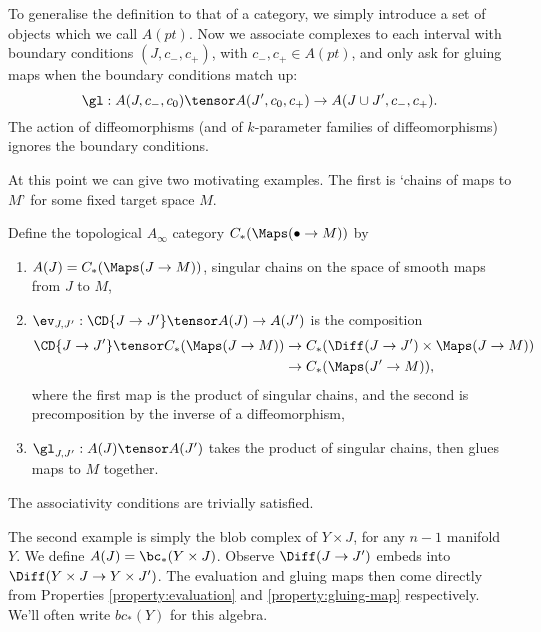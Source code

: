 To generalise the definition to that of a category, we simply introduce a set of objects which we call $A(pt)$. Now we associate complexes to each
interval with boundary conditions $(J, c_-, c_+)$, with $c_-, c_+ \in A(pt)$, and only ask for gluing maps when the boundary conditions match up:
\begin{equation*}
\gl : A(J, c_-, c_0) \tensor A(J', c_0, c_+) \to A(J \cup J', c_-, c_+).
\end{equation*}
The action of diffeomorphisms (and of $k$-parameter families of diffeomorphisms) ignores the boundary conditions.

At this point we can give two motivating examples. The first is `chains of maps to $M$' for some fixed target space $M$.
\begin{defn}
Define the topological $A_\infty$ category $C_*(\Maps(\bullet \to M))$ by
\begin{enumerate}
\item $A(J) = C_*(\Maps(J \to M))$, singular chains on the space of smooth maps from $J$ to $M$,
\item $\ev_{J,J'} : \CD{J \to J'} \tensor A(J) \to A(J')$ is the composition
\begin{align*}
\CD{J \to J'} \tensor C_*(\Maps(J \to M)) & \to C_*(\Diff(J \to J') \times \Maps(J \to M)) \\ & \to C_*(\Maps(J' \to M)),
\end{align*}
where the first map is the product of singular chains, and the second is precomposition by the inverse of a diffeomorphism,
\item $\gl_{J,J'} : A(J) \tensor A(J')$ takes the product of singular chains, then glues maps to $M$ together.
\end{enumerate}
The associativity conditions are trivially satisfied.
\end{defn}

The second example is simply the blob complex of $Y \times J$, for any $n-1$ manifold $Y$. We define $A(J) = \bc_*(Y \times J)$.
Observe $\Diff(J \to J')$ embeds into $\Diff(Y \times J \to Y \times J')$. The evaluation and gluing maps then come directly from Properties
\ref{property:evaluation} and \ref{property:gluing-map} respectively. We'll often write $bc_*(Y)$ for this algebra.

